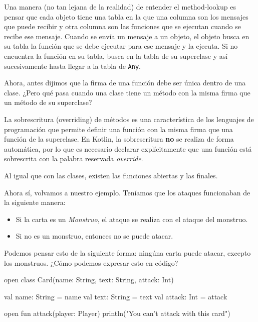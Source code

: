   Una manera (no tan lejana de la realidad) de entender el method-lookup es pensar que cada objeto
  tiene una tabla en la que una columna son los mensajes que puede recibir y otra columna son las
  funciones que se ejecutan cuando se recibe ese mensaje.
  Cuando se envía un mensaje a un objeto, el objeto busca en su tabla la función que se debe
  ejecutar para ese mensaje y la ejecuta.
  Si no encuentra la función en su tabla, busca en la tabla de su superclase y así sucesivamente hasta
  llegar a la tabla de \texttt{Any}.
  
  Ahora, antes dijimos que la firma de una función debe ser única dentro de una clase.
  ¿Pero qué pasa cuando una clase tiene un método con la misma firma que un método de su superclase?

  \begin{defaultbox}
    La sobrescritura (overriding) de métodos es una característica 
    de los lenguajes de programación que permite definir una función con la misma firma que una 
    función de la superclase.
    En Kotlin, la sobrescritura \textbf{no} se realiza de forma automática, por lo que es necesario
    declarar explícitamente que una función está sobrescrita con la palabra reservada
    \textit{override}.
  \end{defaultbox}

  \begin{note}
    Al igual que con las clases, existen las funciones abiertas y las
    finales.
  \end{note}

  Ahora sí, volvamos a nuestro ejemplo.
  Teníamos que los ataques funcionaban de la siguiente manera:

  \begin{itemize}
    \item Si la carta es un \textit{Monstruo}, el ataque se realiza con el ataque del monstruo.
    \item Si no es un monstruo, entonces no se puede atacar.
  \end{itemize}

  Podemos pensar esto de la siguiente forma: ningúna carta puede atacar, excepto los monstruos.
  ¿Cómo podemos expresar esto en código?

  \begin{kotlin}
    open class Card(name: String, text: String, attack: Int) {
      val name: String = name
      val text: String = text
      val attack: Int = attack

      open fun attack(player: Player) {
        println("You can't attack with this card")
      }
    }
  \end{kotlin}

